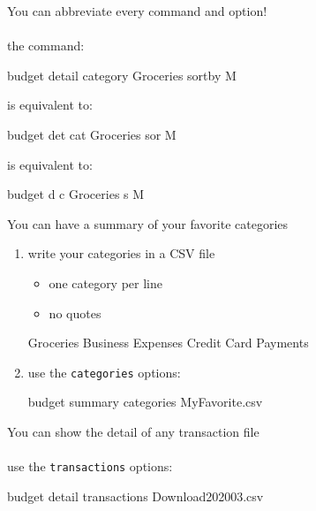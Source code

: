 \documentclass[12pt,letterpaper]{article}
\begin{document}
\Large
\begin{framed}
    \begin{minipage}[t][3in][t]{5in}
        You can abbreviate every command and option! \\ \\
        the command:
        \begin{budget}
            budget detail category Groceries sortby M
        \end{budget}
        is equivalent to: 
        \begin{budget}
            budget det cat Groceries sor M
        \end{budget}
        is equivalent to: 
        \begin{budget}
            budget d c Groceries s M
        \end{budget}
    \end{minipage}
\end{framed}
\begin{framed}
    \begin{minipage}[t][3in][t]{5in}
        You can have a summary of your favorite categories 
        \large
        \begin{enumerate}
            \item write your categories in a CSV file
                \begin{itemize}
                    \item one category per line
                    \item no quotes
                \end{itemize}
                \begin{budget}
                    Groceries
                    Business Expenses
                    Credit Card Payments
                \end{budget}
            \item use the \lstinline[language=budget,basicstyle=\large]!categories! options:
                \begin{budget}
                    budget summary categories MyFavorite.csv 
                \end{budget}
        \end{enumerate}
    \end{minipage}
\end{framed}
\begin{framed}
    \begin{minipage}[t][3in][t]{5in}
        \large
        You can show the detail of any transaction file\\ \\
            use the \lstinline[language=budget,basicstyle=\large]!transactions! options: \\
                \begin{budget}
                    budget detail transactions Download202003.csv
                \end{budget}
    \end{minipage}
\end{framed}
\end{document}
